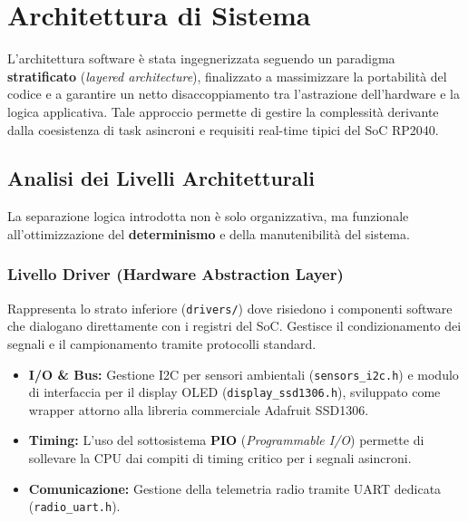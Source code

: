 \newpage
\section{Architettura di Sistema}

L'architettura software è stata ingegnerizzata seguendo un paradigma \textbf{stratificato} (\textit{layered architecture}), finalizzato a massimizzare la portabilità del codice e a garantire un netto disaccoppiamento tra l'astrazione dell'hardware e la logica applicativa. Tale approccio permette di gestire la complessità derivante dalla coesistenza di task asincroni e requisiti real-time tipici del SoC RP2040.


\subsection{Analisi dei Livelli Architetturali}

La separazione logica introdotta non è solo organizzativa, ma funzionale all'ottimizzazione del \textbf{determinismo} e della manutenibilità del sistema.

\subsubsection*{Livello Driver (Hardware Abstraction Layer)}
Rappresenta lo strato inferiore (\texttt{drivers/}) dove risiedono i componenti software che dialogano direttamente con i registri del SoC. Gestisce il condizionamento dei segnali e il campionamento tramite protocolli standard.
\begin{itemize}
    \item \textbf{I/O \& Bus:} Gestione I2C per sensori ambientali (\texttt{sensors\_i2c.h}) e modulo di interfaccia per il display OLED (\texttt{display\_ssd1306.h}), sviluppato come wrapper attorno alla libreria commerciale Adafruit SSD1306.
    \item \textbf{Timing:} L'uso del sottosistema \textbf{PIO} (\textit{Programmable I/O}) permette di sollevare la CPU dai compiti di timing critico per i segnali asincroni.
    \item \textbf{Comunicazione:} Gestione della telemetria radio tramite UART dedicata (\texttt{radio\_uart.h}).
\end{itemize}

